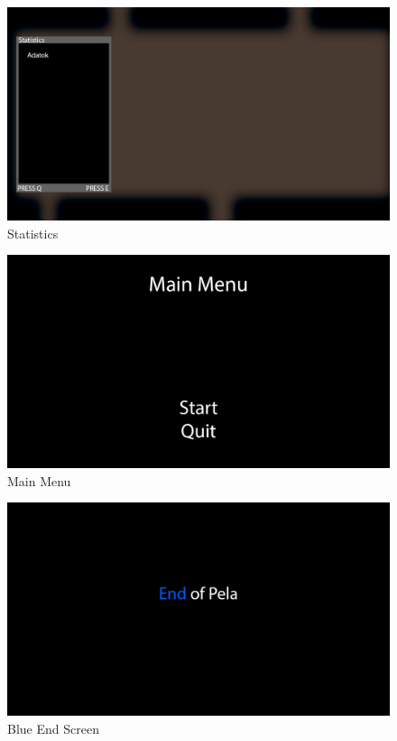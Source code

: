 \begin{figure}[!ht]
	\centering
	\includegraphics[scale=0.3]{images/Statistics.png}
	\caption{Statistics}
	\label{fig:Statistics}
\end{figure}

\begin{figure}[!ht]
	\centering
	\includegraphics[scale=0.3]{images/MainMenu.png}
	\caption{Main Menu}
	\label{fig:MainMenu}
\end{figure}

\begin{figure}[!ht]
	\centering
	\includegraphics[scale=0.3]{images/endscreenblue.png}
	\caption{Blue End Screen}
	\label{fig:BlueEndScreen}
\end{figure}

